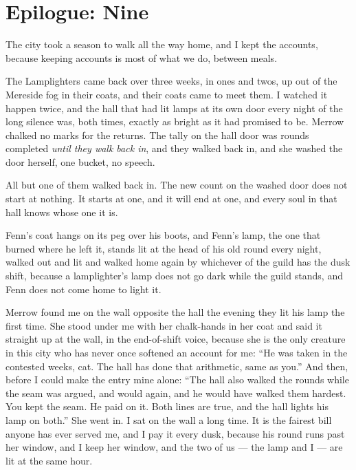 \chapter*{Epilogue: Nine}

The city took a season to walk all the way home, and I kept the accounts, because keeping accounts is most of what we do, between meals.

The Lamplighters came back over three weeks, in ones and twos, up out of the Mereside fog in their coats, and their coats came to meet them. I watched it happen twice, and the hall that had lit lamps at its own door every night of the long silence was, both times, exactly as bright as it had promised to be. Merrow chalked no marks for the returns. The tally on the hall door was rounds completed \emph{until they walk back in}, and they walked back in, and she washed the door herself, one bucket, no speech.

All but one of them walked back in. The new count on the washed door does not start at nothing. It starts at one, and it will end at one, and every soul in that hall knows whose one it is.

Fenn's coat hangs on its peg over his boots, and Fenn's lamp, the one that burned where he left it, stands lit at the head of his old round every night, walked out and lit and walked home again by whichever of the guild has the dusk shift, because a lamplighter's lamp does not go dark while the guild stands, and Fenn does not come home to light it.

Merrow found me on the wall opposite the hall the evening they lit his lamp the first time. She stood under me with her chalk-hands in her coat and said it straight up at the wall, in the end-of-shift voice, because she is the only creature in this city who has never once softened an account for me: ``He was taken in the contested weeks, cat. The hall has done that arithmetic, same as you.'' And then, before I could make the entry mine alone: ``The hall also walked the rounds while the seam was argued, and would again, and he would have walked them hardest. You kept the seam. He paid on it. Both lines are true, and the hall lights his lamp on both.'' She went in. I sat on the wall a long time. It is the fairest bill anyone has ever served me, and I pay it every dusk, because his round runs past her window, and I keep her window, and the two of us --- the lamp and I --- are lit at the same hour.

